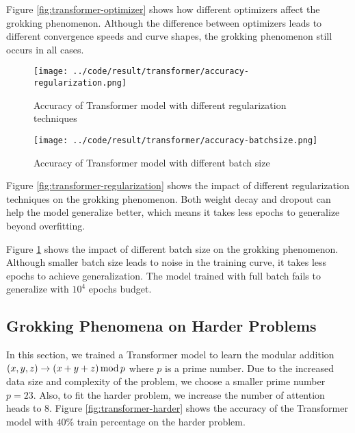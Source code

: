 \documentclass{article}
\begin{document}
Figure \ref{fig:transformer-optimizer} shows how different optimizers affect the grokking phenomenon. Although the difference between optimizers leads to different convergence speeds and curve shapes, the grokking phenomenon still occurs in all cases.

\begin{figure}[htbp]
    \centering
    \begin{minipage}[t]{0.45\textwidth}
    \centering
    \texttt{[image: ../code/result/transformer/accuracy-regularization.png]}
    \caption{Accuracy of Transformer model with different regularization techniques}
    \label{fig:transformer-regularization}
    \end{minipage}
    \hspace{0.05\textwidth}
    \begin{minipage}[t]{0.45\textwidth}
    \centering
    \texttt{[image: ../code/result/transformer/accuracy-batchsize.png]}
    \caption{Accuracy of Transformer model with different batch size}
    \label{fig:transformer-batchsize}
    \end{minipage}
\end{figure}

Figure \ref{fig:transformer-regularization} shows the impact of different regularization techniques on the grokking phenomenon. Both weight decay and dropout can help the model generalize better, which means it takes less epochs to generalize beyond overfitting.

    

Figure \ref{fig:transformer-batchsize} shows the impact of different batch size on the grokking phenomenon. Although smaller batch size leads to noise in the training curve, it takes less epochs to achieve generalization. The model trained with full batch fails to generalize with $10^4$ epochs budget.

\subsection{Grokking Phenomena on Harder Problems}

In this section, we trained a Transformer model to learn the modular addition $(x, y, z) \rightarrow (x + y + z)\, {\rm mod}\, p$ where $p$ is a prime number. Due to the increased data size and complexity of the problem, we choose a smaller prime number $p=23$. Also, to fit the harder problem, we increase the number of attention heads to 8. Figure \ref{fig:transformer-harder} shows the accuracy of the Transformer model with $40\%$ train percentage on the harder problem.
\end{document}
